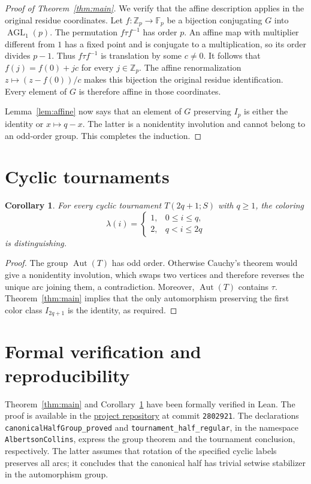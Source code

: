 \documentclass[11pt]{article}
\newtheorem{corollary}[theorem]{Corollary}
\newcommand{\Z}{\mathbb Z}
\newcommand{\F}{\mathbb F}
\newcommand{\Aut}{\operatorname{Aut}}
\newcommand{\AGL}{\operatorname{AGL}}
\begin{document}
\begin{proof}[Proof of Theorem~\ref{thm:main}]
We verify that the affine description applies in the original residue
coordinates. Let $f:\Z_p\to\F_p$ be a bijection conjugating $G$ into
$\AGL_1(p)$. The permutation $f\tau f^{-1}$ has order $p$. An affine
map with multiplier different from $1$ has a fixed point and is
conjugate to a multiplication, so its order divides $p-1$.
Thus $f\tau f^{-1}$ is translation by some $c\neq0$. It follows that
$f(j)=f(0)+jc$ for every $j\in\Z_p$. The affine renormalization
$z\mapsto(z-f(0))/c$ makes this bijection the original residue
identification. Every element of $G$ is therefore affine in those
coordinates.

Lemma~\ref{lem:affine} now says that an element of $G$ preserving
$I_p$ is either the identity or $x\mapsto q-x$. The latter is a
nonidentity involution and cannot belong to an odd-order group.
This completes the induction.
\end{proof}

\section{Cyclic tournaments}
\begin{corollary}\label{cor:AC}
For every cyclic tournament $T(2q+1;S)$ with $q\geq1$, the coloring
\[
 \lambda(i)=
 \begin{cases}1,&0\leq i\leq q,\\2,&q<i\leq2q\end{cases}
\]
is distinguishing.
\end{corollary}
\begin{proof}
The group $\Aut(T)$ has odd order. Otherwise Cauchy's theorem would
give a nonidentity involution, which swaps two vertices and therefore
reverses the unique arc joining them, a contradiction. Moreover,
$\Aut(T)$ contains $\tau$. Theorem~\ref{thm:main} implies that the
only automorphism preserving the first color class $I_{2q+1}$ is the
identity, as required.
\end{proof}

\section{Formal verification and reproducibility}
Theorem~\ref{thm:main} and Corollary~\ref{cor:AC} have been formally
verified in Lean. The proof is available in the
\href{https://github.com/alexgocardinal/albertson-collins/tree/2802921/lean}{project repository}
at commit \texttt{2802921}. The declarations
\texttt{canonicalHalfGroup\_proved} and
\texttt{tournament\_half\_regular}, in the namespace
\texttt{AlbertsonCollins}, express the group theorem and the tournament
conclusion, respectively. The latter assumes that rotation of the
specified cyclic labels preserves all arcs; it concludes that the
canonical half has trivial setwise stabilizer in the automorphism group.
\end{document}
